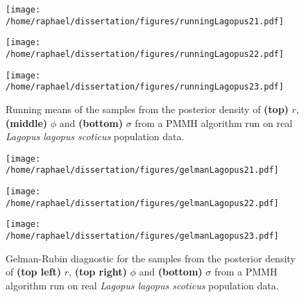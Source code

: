 \documentclass[12pt]{article}
\begin{document}
\begin{appendices}
\clearpage
\thispagestyle{empty}
\restoregeometry
	\begin{figure}[htb]
		\centering
		\begin{minipage}{0.6\textwidth}
			\centering
			\texttt{[image: /home/raphael/dissertation/figures/runningLagopus21.pdf]}
		\end{minipage}
		\begin{minipage}{0.6\textwidth}
			\centering
			\texttt{[image: /home/raphael/dissertation/figures/runningLagopus22.pdf]}
		\end{minipage}
		\begin{minipage}{0.6\textwidth}
			\centering
			\texttt{[image: /home/raphael/dissertation/figures/runningLagopus23.pdf]}
		\end{minipage}
		\caption[Running means of the samples from a PMMH algorithm run on real \emph{Lagopus lagopus scoticus} population data]{Running means of the samples from the posterior density of \textbf{(top)} $r$, \textbf{(middle)} $\phi$ and \textbf{(bottom)} $\sigma$ from a PMMH algorithm run on real \emph{Lagopus lagopus scoticus} population data.}
		\label{fig:rmLagopus}
	\end{figure}
	
\clearpage
\thispagestyle{empty}
	\begin{figure}[htb]
		\centering
		\begin{minipage}{0.6\textwidth}
			\centering
			\texttt{[image: /home/raphael/dissertation/figures/gelmanLagopus21.pdf]}
		\end{minipage}
		\begin{minipage}{0.6\textwidth}
			\centering
			\texttt{[image: /home/raphael/dissertation/figures/gelmanLagopus22.pdf]}
		\end{minipage}
		\begin{minipage}{0.6\textwidth}
			\centering
			\texttt{[image: /home/raphael/dissertation/figures/gelmanLagopus23.pdf]}
		\end{minipage}
		\caption[Gelman-Rubin diagnostic of the chains of a PMMH algorithm run on real \emph{Lagopus lagopus scoticus} population data]{Gelman-Rubin diagnostic for the samples from the posterior density of \textbf{(top left)} $r$, \textbf{(top right)} $\phi$ and \textbf{(bottom)} $\sigma$ from a PMMH algorithm run on real \emph{Lagopus lagopus scoticus} population data.}
		\label{fig:gelmanLagopus}
	\end{figure}
	

\end{appendices}
\end{document}
